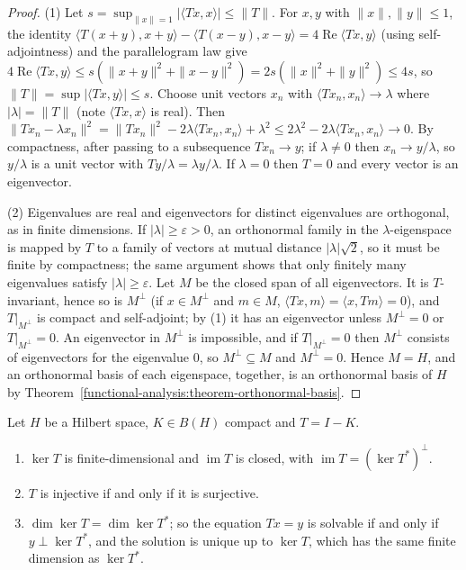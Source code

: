 \begin{proof}
(1) Let $s = \sup_{\|x\|=1}|\langle Tx, x \rangle| \leq \|T\|$. For $x, y$ with $\|x\|, \|y\| \leq 1$, the identity
$\langle T(x + y), x + y \rangle - \langle T(x - y), x - y \rangle = 4\operatorname{Re}\langle Tx, y \rangle$ (using self-adjointness) and the parallelogram law give
$4\operatorname{Re}\langle Tx, y \rangle \leq s(\|x + y\|^2 + \|x - y\|^2) = 2s(\|x\|^2 + \|y\|^2) \leq 4s$, so $\|T\| = \sup|\langle Tx, y \rangle| \leq s$. Choose unit vectors $x_n$ with
$\langle Tx_n, x_n \rangle \to \lambda$ where $|\lambda| = \|T\|$ (note $\langle Tx, x \rangle$ is real). Then
$\|Tx_n - \lambda x_n\|^2 = \|Tx_n\|^2 - 2\lambda\langle Tx_n, x_n \rangle + \lambda^2 \leq 2\lambda^2 - 2\lambda\langle Tx_n, x_n \rangle \to 0$. By compactness, after passing to a subsequence
$Tx_n \to y$; if $\lambda \neq 0$ then $x_n \to y/\lambda$, so $y/\lambda$ is a unit vector with $Ty/\lambda = \lambda y/\lambda$. If $\lambda = 0$ then $T = 0$ and every vector is an eigenvector.

(2) Eigenvalues are real and eigenvectors for distinct eigenvalues are orthogonal, as in finite dimensions. If $|\lambda| \geq \varepsilon > 0$, an orthonormal family in the $\lambda$-eigenspace is mapped by $T$ to
a family of vectors at mutual distance $|\lambda|\sqrt2$, so it must be finite by compactness; the same argument shows that only finitely many eigenvalues satisfy $|\lambda| \geq \varepsilon$. Let $M$ be the
closed span of all eigenvectors. It is $T$-invariant, hence so is $M^\perp$ (if $x \in M^\perp$ and $m \in M$, $\langle Tx, m \rangle = \langle x, Tm \rangle = 0$), and $T|_{M^\perp}$ is compact and
self-adjoint; by (1) it has an eigenvector unless $M^\perp = 0$ or $T|_{M^\perp} = 0$. An eigenvector in $M^\perp$ is impossible, and if $T|_{M^\perp} = 0$ then $M^\perp$ consists of eigenvectors for the
eigenvalue $0$, so $M^\perp \subseteq M$ and $M^\perp = 0$. Hence $M = H$, and an orthonormal basis of each eigenspace, together, is an orthonormal basis of $H$ by
Theorem~\ref{functional-analysis:theorem-orthonormal-basis}.
\end{proof}

\begin{theorem}\label{functional-analysis:theorem-fredholm-alternative}
Let $H$ be a Hilbert space, $K \in B(H)$ compact and $T = I - K$.
\begin{enumerate}
\item $\ker T$ is finite-dimensional and $\operatorname{im}T$ is closed, with $\operatorname{im}T = (\ker T^*)^\perp$.
\item $T$ is injective if and only if it is surjective.
\item $\dim\ker T = \dim\ker T^*$; so the equation $Tx = y$ is solvable if and only if $y \perp \ker T^*$, and the solution is unique up to $\ker T$, which has the same finite dimension as $\ker T^*$.
\end{enumerate}
\end{theorem}

